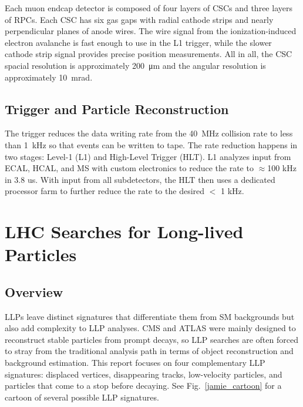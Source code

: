 \documentclass[12pt]{article}
\begin{document}
        Each muon endcap detector is composed of four layers of CSCs and three layers of RPCs. Each CSC has six gas gaps with radial cathode strips and nearly perpendicular planes of anode wires. The wire signal from the ionization-induced electron avalanche is fast enough to use in the L1 trigger, while the slower  cathode strip signal provides precise  position measurements. All in all, the CSC spacial resolution is approximately \SI{200}{\micro\m} and the angular resolution is approximately \SI{10}{\milli\radian}.

    \subsection{Trigger and Particle Reconstruction}
        The trigger reduces the data writing rate from the \SI{40}{\mega\hertz} collision rate to less than \SI{1}{\kilo\hertz} so that events can be written to tape. The rate reduction happens in two stages: Level-1 (L1) and High-Level Trigger (HLT). L1 analyzes input from ECAL, HCAL, and MS with custom electronics to reduce the rate to $\approx$100 kHz in 3.8 us. With input from all subdetectors, the HLT then uses a dedicated processor farm to further reduce the rate to the desired $<$ 1 kHz\cite{cms_experiment, cms_trigger_upgrade}.

        

\section{LHC Searches for Long-lived Particles} \label {analyses}
    \subsection{Overview}
        LLPs leave distinct signatures that differentiate them from SM backgrounds but also add complexity to LLP analyses. CMS and ATLAS were mainly designed to reconstruct stable particles from prompt decays, so LLP searches are often forced to stray from the traditional analysis path in terms of object reconstruction and background estimation. This report focuses on four complementary LLP signatures: displaced vertices, disappearing tracks, low-velocity particles, and particles that come to a stop before decaying. See Fig.~\ref{jamie_cartoon} for a cartoon of several possible LLP signatures.
\end{document}
